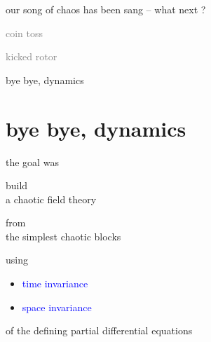 \begin{frame}{our song of chaos has been sang -- what next ?}
\begin{enumerate}
              \item \textcolor{gray}{\small
coin toss
              \item
kicked rotor
              \item
\catlatt
                  }
              \item {\Large
bye bye, dynamics
                    }
            \end{enumerate}
\end{frame} %


\section[bye bye, dynamics]
 {bye bye, dynamics}
\label{s:byeDynamics}

\begin{frame}{the goal was}
\vfill

\begin{center}
{\Large build
\\
a chaotic field theory
\medskip

from
\\
the simplest chaotic blocks}
\end{center}

\vfill
using
\begin{itemize}
  \item
\textcolor{blue}{time invariance}
  \item
\textcolor{blue}{space invariance}
\end{itemize}
 of the defining partial differential equations
\end{frame} %

